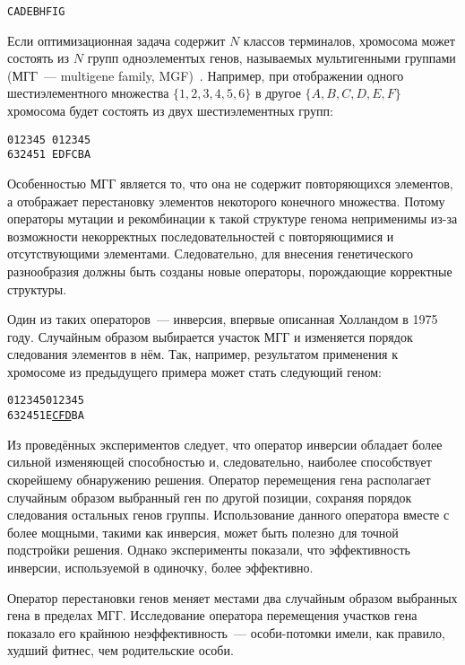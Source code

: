 \begin{verbatim}
CADEBHFIG
\end{verbatim}

Если оптимизационная задача содержит $N$ классов терминалов, хромосома может состоять из $N$ групп одноэлементых генов, называемых мультигенными группами (МГГ~--- multigene family, MGF)~\cite{ferreira:2002:ASIA}. Например, при отображении одного шестиэлементного множества $\{1, 2, 3, 4, 5, 6\}$ в другое $\{A, B, C, D, E, F\}$ хромосома будет состоять из двух шестиэлементных групп:

\begin{samepage}
\begin{verbatim}
012345 012345
632451 EDFCBA
\end{verbatim}
\end{samepage}

Особенностью МГГ является то, что она не содержит повторяющихся элементов, а отображает перестановку элементов некоторого конечного множества. Потому операторы мутации и рекомбинации к такой структуре генома неприменимы из-за возможности некорректных последовательностей с повторяющимися и отсутствующими элементами. Следовательно, для внесения генетического разнообразия должны быть созданы новые операторы, порождающие корректные структуры.

Один из таких операторов~--- инверсия, впервые описанная Холландом в 1975 году. Случайным образом выбирается участок МГГ и изменяется порядок следования элементов в нём. Так, например, результатом применения к хромосоме из предыдущего примера может стать следующий геном:

\begin{samepage}
\begin{alltt}
012345 012345
632451 E{\underline{CFD}}BA
\end{alltt}
\end{samepage}

Из проведённых экспериментов следует, что оператор инверсии обладает более сильной изменяющей способностью и, следовательно, наиболее способствует скорейшему обнаружению решения.
Оператор перемещения гена располагает случайным образом выбранный ген по другой позиции, сохраняя порядок следования остальных генов группы. Использование данного оператора вместе с более мощными, такими как инверсия, может быть полезно для точной подстройки решения. Однако эксперименты показали, что эффективность инверсии, используемой в одиночку, более эффективно.

Оператор перестановки генов меняет местами два случайным образом выбранных гена в пределах МГГ. Исследование оператора перемещения участков гена показало его крайнюю неэффективность~--- особи-потомки имели, как правило, худший фитнес, чем родительские особи.

